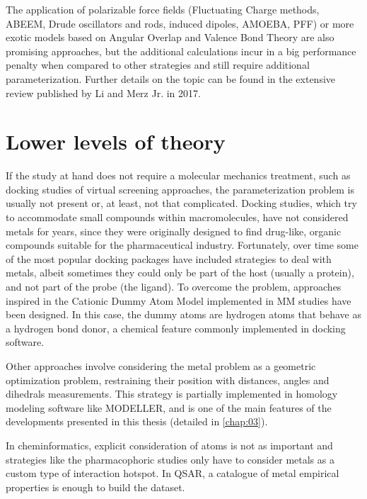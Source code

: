 The application of polarizable force fields (Fluctuating Charge methods, ABEEM, Drude oscillators and rods, induced dipoles, AMOEBA, PFF) or more exotic models based on Angular Overlap and Valence Bond Theory are also promising approaches, but the additional calculations incur in a big performance penalty when compared to other strategies and still require additional parameterization. Further details on the topic can be found in the extensive review published by Li and Merz Jr. in 2017.\cite{li2017}

\section{Lower levels of theory}
If the study at hand does not require a molecular mechanics treatment, such as docking studies of virtual screening approaches, the parameterization problem is usually not present or, at least, not that complicated. Docking studies, which try to accommodate small compounds within macromolecules, have not considered metals for years, since they were originally designed to find drug-like, organic compounds suitable for the pharmaceutical industry. Fortunately, over time some of the most popular docking packages have included strategies to deal with metals,\cite{flexx} albeit sometimes they could only be part of the host (usually a protein), and not part of the probe (the ligand).\cite{verdonk2003improved} To overcome the problem, approaches inspired in the Cationic Dummy Atom Model implemented in MM studies have been designed. In this case, the dummy atoms are hydrogen atoms that behave as a hydrogen bond donor, a chemical feature commonly implemented in docking software.

Other approaches involve considering the metal problem as a geometric optimization problem, restraining their position with distances, angles and dihedrals measurements. This strategy is partially implemented in homology modeling software like MODELLER, \cite{Sali1993} and is one of the main features of the developments presented in this thesis (detailed in \autoref{chap:03}).

In cheminformatics, explicit consideration of atoms is not as important and strategies like the pharmacophoric studies only have to consider metals as a custom type of interaction hotspot.\cite{johns2009,kawasuji2012,carcelli2014,yang2016} In QSAR, a catalogue of metal empirical properties is enough to build the dataset.\cite{walker2012fundamental}


